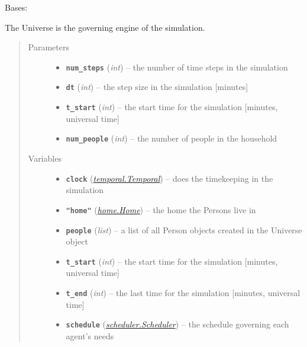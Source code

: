 \documentclass[letterpaper,10pt,english]{sphinxmanual}
\begin{document}
\begin{fulllineitems}
\label{universe:universe.Universe}
Bases: 

The Universe is the governing engine of the simulation.
\begin{quote}\begin{description}
\item[{Parameters}] \leavevmode\begin{itemize}
\item {} 
\textbf{\texttt{num\_steps}} (\emph{int}) -- the number of time steps in the simulation

\item {} 
\textbf{\texttt{dt}} (\emph{int}) -- the step size in the simulation {[}minutes{]}

\item {} 
\textbf{\texttt{t\_start}} (\emph{int}) -- the start time for the simulation {[}minutes, universal time{]}

\item {} 
\textbf{\texttt{num\_people}} (\emph{int}) -- the number of people in the household

\end{itemize}

\item[{Variables}] \leavevmode\begin{itemize}
\item {} 
\textbf{\texttt{clock}} ({\hyperref[temporal:temporal.Temporal]{\emph{\emph{temporal.Temporal}}}}) -- does the timekeeping in the simulation

\item {} 
\textbf{\texttt{"home"}} ({\hyperref[home:home.Home]{\emph{\emph{home.Home}}}}) -- the home the Persons live in

\item {} 
\textbf{\texttt{people}} (\emph{list}) -- a list of all Person objects created in the Universe object

\item {} 
\textbf{\texttt{t\_start}} (\emph{int}) -- the start time for the simulation {[}minutes, universal time{]}

\item {} 
\textbf{\texttt{t\_end}} (\emph{int}) -- the last time for the simulation {[}minutes, universal time{]}

\item {} 
\textbf{\texttt{schedule}} ({\hyperref[scheduler:scheduler.Scheduler]{\emph{\emph{scheduler.Scheduler}}}}) -- the schedule governing each agent's needs


\end{itemize}
\end{description}
\end{quote}
\end{fulllineitems}
\end{document}
